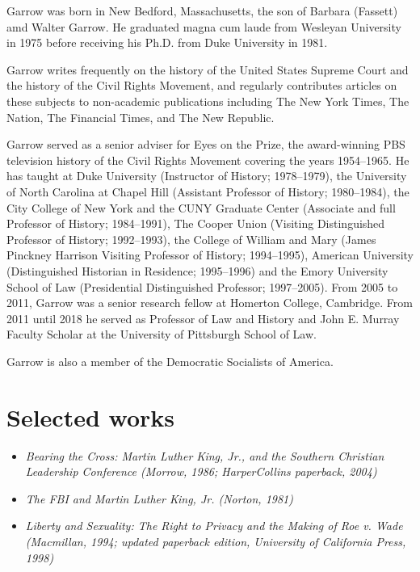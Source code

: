 Garrow was born in New Bedford, Massachusetts, the son of Barbara
(Fassett) amd Walter Garrow. He graduated magna cum laude from Wesleyan
University in 1975 before receiving his Ph.D. from Duke University in
1981.

Garrow writes frequently on the history of the United States Supreme
Court and the history of the Civil Rights Movement, and regularly
contributes articles on these subjects to non-academic publications
including The New York Times, The Nation, The Financial Times, and The
New Republic.

Garrow served as a senior adviser for Eyes on the Prize, the
award-winning PBS television history of the Civil Rights Movement
covering the years 1954--1965. He has taught at Duke University
(Instructor of History; 1978--1979), the University of North Carolina at
Chapel Hill (Assistant Professor of History; 1980--1984), the City
College of New York and the CUNY Graduate Center (Associate and full
Professor of History; 1984--1991), The Cooper Union (Visiting
Distinguished Professor of History; 1992--1993), the College of William
and Mary (James Pinckney Harrison Visiting Professor of History;
1994--1995), American University (Distinguished Historian in Residence;
1995--1996) and the Emory University School of Law (Presidential
Distinguished Professor; 1997--2005). From 2005 to 2011, Garrow was a
senior research fellow at Homerton College, Cambridge. From 2011 until
2018 he served as Professor of Law and History and John E. Murray
Faculty Scholar at the University of Pittsburgh School of Law.

Garrow is also a member of the Democratic Socialists of America.

\section{Selected works}\label{selected-works}

\begin{itemize}
\item
  \emph{Bearing the Cross: Martin Luther King, Jr., and the Southern
  Christian Leadership Conference (Morrow, 1986; HarperCollins
  paperback, 2004)}
\item
  \emph{The FBI and Martin Luther King, Jr. (Norton, 1981)}
\item
  \emph{Liberty and Sexuality: The Right to Privacy and the Making of
  Roe v. Wade (Macmillan, 1994; updated paperback edition, University of
  California Press, 1998)}
\end{itemize}

